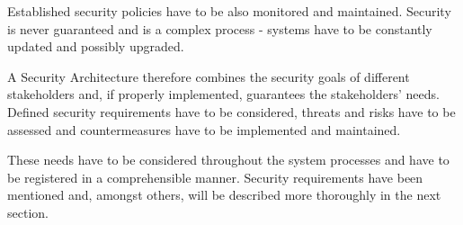 Established security policies have to be also monitored and maintained. Security is never guaranteed and is a complex process \cite{vacca2012computer} - systems have to be constantly updated and possibly upgraded. 

A Security Architecture therefore combines the security goals of different stakeholders and, if properly implemented, guarantees the stakeholders' needs. Defined security requirements have to be considered, threats and risks have to be assessed and countermeasures have to be implemented and maintained.

These needs have to be considered throughout the system processes and have to be registered in a comprehensible manner. Security requirements have been mentioned and, amongst others, will be described more thoroughly in the next section.

